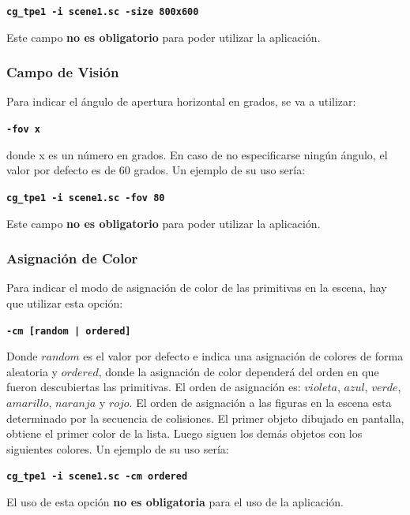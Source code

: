 \documentclass[a4paper,10pt]{article}
\begin{document}
 \begin{center}
 \textbf{\texttt{cg\_tpe1 -i scene1.sc -size 800x600}}
\end{center}

Este campo \textbf{no es obligatorio} para poder utilizar la aplicaci\'on.

\subsubsection{Campo de Visi\'on}
Para indicar el \'angulo de apertura horizontal en grados, se va a utilizar:

\begin{center}
  \textbf{\texttt{-fov x}}
\end{center}

donde x es un n\'umero en grados.  En caso de no especificarse ning\'un \'angulo, el valor por defecto es de 60 grados.  Un ejemplo de su uso ser\'ia:

 \begin{center}
 \textbf{\texttt{cg\_tpe1 -i scene1.sc -fov 80}}
\end{center}

Este campo \textbf{no es obligatorio} para poder utilizar la aplicaci\'on.

\subsubsection{Asignaci\'on de Color}
Para indicar el modo de asignaci\'on de color de las primitivas en la escena, hay que utilizar esta opci\'on:
\begin{center}
  \textbf{\texttt{-cm [random | ordered]}}
\end{center}

Donde $random$ es el valor por defecto e indica una asignaci\'on de colores de forma aleatoria y $ordered$, donde la asignaci\'on de color depender\'a del orden en que fueron descubiertas las primitivas.  El orden de asignaci\'on es: $violeta$, $azul$, $verde$, $amarillo$, $naranja$ y $rojo$. El orden de asignaci\'on a las figuras en la escena esta determinado por la secuencia de colisiones. El primer objeto dibujado en pantalla, obtiene el primer color de la lista. Luego siguen los dem\'as objetos con los siguientes colores.
Un ejemplo de su uso ser\'ia:
 \begin{center}
 \textbf{\texttt{cg\_tpe1 -i scene1.sc -cm ordered}}
\end{center}

El uso de esta opci\'on \textbf{no es obligatoria} para el uso de la aplicaci\'on.
\end{document}
